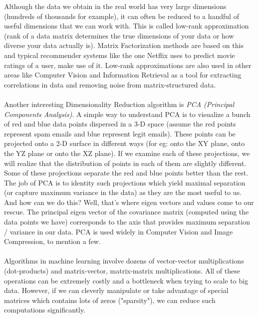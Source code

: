 \documentclass[a4paper]{article}
\begin{document}
\noindent Although the data we obtain in the real world has very large dimensions (hundreds of thousands for example), it can often be reduced to a handful of useful dimensions that we can work with. This is called low-rank approximation (rank of a data matrix determines the true dimensions of your data or how diverse your data actually is). Matrix Factorization methods are based on this and typical recommender systems like the one Netflix uses to predict movie ratings of a user, make use of it. Low-rank approximations are also used in other areas like Computer Vision and Information Retrieval as a tool for extracting correlations in data and removing noise from matrix-structured data. \\ \\ Another interesting Dimensionality Reduction algorithm is {\it PCA (Principal Components Analysis)}. A simple way to understand PCA is to visualize a bunch of red and blue data points dispersed in a 3-D space (assume the red points represent spam emails and blue represent legit emails). These points can be projected onto a 2-D surface in different ways (for eg: onto the XY plane, onto the YZ plane or onto the XZ plane). If we examine each of these projections, we will realize that the distribution of points in each of them are slightly different. Some of these projections separate the red and blue points better than the rest. The job of PCA is to identity such projections which yield maximal separation (or capture maximum variance in the data) as they are the most useful to us. And how can we do this? Well, that's where eigen vectors and values come to our rescue. The principal eigen vector of the covariance matrix (computed using the data points we have) corresponds to the axis that provides maximum separation / variance in our data. PCA is used widely in Computer Vision and Image Compression, to mention a few. \\ \\ Algorithms in machine learning involve dozens of vector-vector multiplications (dot-products) and matrix-vector, matrix-matrix multiplications. All of these operations can be extremely costly and a bottleneck when trying to scale to big data. However, if we can cleverly manipulate or take advantage of special matrices which contains lots of zeros ("sparsity"), we can reduce such computations significantly.\\
\end{document}
